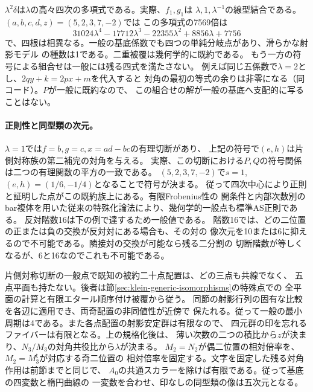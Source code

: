 $\lambda^2\delta$は$\lambda$の高々四次の多項式である。実際、$f_1,g_1$は
$\lambda,1,\lambda^{-1}$の線型結合である。$(a,b,c,d,z)=(5,2,3,7,-2)$では
この多項式の7569倍は
\[
 31024\lambda^4-17712\lambda^3-22355\lambda^2+8856\lambda+7756
\]
で、四根は相異なる。一般の基底係数でも四つの単純分岐点があり、滑らかな射影モデル
の種数は1である。二重被覆は幾何学的に既約である。
もう一方の符号による組合せは一般には残る四式を満たさない。
例えば同じ五係数で$\lambda=2$とし、$2q y+k=2p x+m$を代入すると
対角の最初の等式の余りは非零になる（同コード）。$P$が一般に既約なので、
この組合せの解が一般の基底へ支配的に写ることはない。

\paragraph{正則性と同型類の次元。}
$\lambda=1$では$f=b,g=c,x=ad-bc$の有理切断があり、
上記の符号で$(e,h)$は片側対称族の第二補完の対角を与える。
実際、この切断における$P,Q$の符号関係は二つの有理関数の平方の一致である。
$(5,2,3,7,-2)$で$s=1$, $(e,h)=(1/6,-1/4)$となることで符号が決まる。
従って四次中心により正則と証明した点がこの既約族上にある。有限Frobenius性の
開条件と内部次数別のbar複体を用いた従来の特殊化論法により、幾何学的一般点も標準AS正則である。
反対階数16は下の例で達するため一般値である。
階数16では、どの二位置の正または負の交換が反対対にある場合も、その対の
像次元を10または6に抑えるので不可能である。隣接対の交換が可能なら残る二分割の
切断階数が等しくなるが、6と16なのでこれも不可能である。

片側対称切断の一般点で既知の被約二十点配置は、どの三点も共線でなく、
五点平面も持たない。後者は節\ref{sec:klein-generic-isomorphisms}の特殊点での
全平面の計算と有限エタール順序付け被覆から従う。
同節の射影行列の固有な比較を各辺に適用でき、両奇配置の非同値性が近傍で
保たれる。従って一般の最小周期は4である。また各点配置の射影安定群は有限なので、
四元群の印を忘れるファイバーは有限となる。上の規格化後は、
薄い次数の二つの積比から$z$が決まり、$N_3/M_3$の対角共役比から$\lambda$が決まる。
$M_2=N_2$が偶二位置の相対倍率を、$M_2=M_3^{\mathsf t}$が対応する奇二位置の
相対倍率を固定する。文字を固定した残る対角作用は前節までと同じで、
$A_0$の共通スカラーを除けば有限である。従って基底の四変数と楕円曲線の
一変数を合わせ、印なしの同型類の像は五次元となる。

